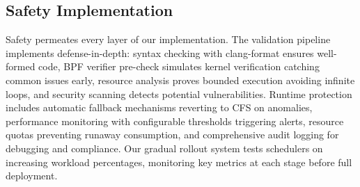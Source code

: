 \subsection{Safety Implementation}

Safety permeates every layer of our implementation. The validation pipeline implements defense-in-depth: syntax checking with clang-format ensures well-formed code, BPF verifier pre-check simulates kernel verification catching common issues early, resource analysis proves bounded execution avoiding infinite loops, and security scanning detects potential vulnerabilities. Runtime protection includes automatic fallback mechanisms reverting to CFS on anomalies, performance monitoring with configurable thresholds triggering alerts, resource quotas preventing runaway consumption, and comprehensive audit logging for debugging and compliance. Our gradual rollout system tests schedulers on increasing workload percentages, monitoring key metrics at each stage before full deployment.
